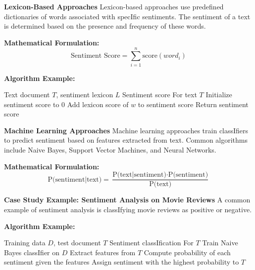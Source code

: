 \documentclass[12pt]{book} %
\begin{document}
\textbf{Lexicon-Based Approaches}
Lexicon-based approaches use predefined dictionaries of words associated with specIfic sentiments. The sentiment of a text is determined based on the presence and frequency of these words.

\textbf{Mathematical Formulation:}
\begin{equation}
\text{Sentiment Score} = \sum_{i=1}^{n} \text{score}(word_i)
\end{equation}

\textbf{Algorithm Example:}
\FloatBarrier
\begin{algorithm}[H]
\caption{Lexicon-Based Sentiment Analysis}
\begin{algorithmic}[1]
\Require Text document $T$, sentiment lexicon $L$
\Ensure Sentiment score For text $T$
\State Initialize sentiment score to 0
        \State Add lexicon score of $w$ to sentiment score
    \EndIf
\EndFor
\State Return sentiment score
\end{algorithmic}
\end{algorithm}
\FloatBarrier

\textbf{Machine Learning Approaches}
Machine learning approaches train classIfiers to predict sentiment based on features extracted from text. Common algorithms include Naive Bayes, Support Vector Machines, and Neural Networks.

\textbf{Mathematical Formulation:}
\begin{equation}
\text{P(sentiment|text)} = \frac{\text{P(text|sentiment)} \cdot \text{P(sentiment)}}{\text{P(text)}}
\end{equation}

\textbf{Case Study Example: Sentiment Analysis on Movie Reviews}
A common example of sentiment analysis is classIfying movie reviews as positive or negative.

\textbf{Algorithm Example:}
\FloatBarrier
\begin{algorithm}[H]
\caption{Naive Bayes Sentiment Analysis}
\begin{algorithmic}[1]
\Require Training data $D$, test document $T$
\Ensure Sentiment classIfication For $T$
\State Train Naive Bayes classIfier on $D$
\State Extract features from $T$
\State Compute probability of each sentiment given the features
\State Assign sentiment with the highest probability to $T$
\end{algorithmic}
\end{algorithm}
\FloatBarrier
\end{document}
